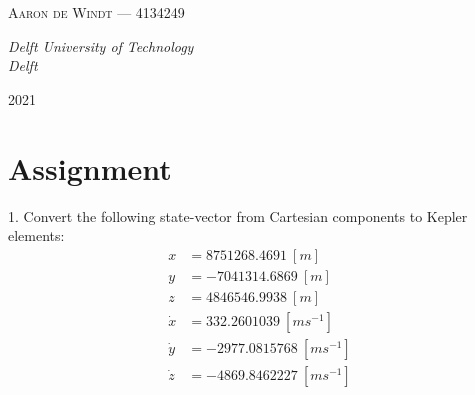 \begin{titlepage}
        
        \vspace{0.5\baselineskip} %
        
        {\scshape\Large Aaron de Windt --- 4134249} %
        
        \vspace{0.5\baselineskip} %
        
        \textit{Delft University of Technology \\ Delft} %
        
        \vfill %
        
        
        
        \vspace{0.3\baselineskip} %
        
        2021 %
        

    \end{titlepage}


    
    \newpage
    
    \section{Assignment}
    1. Convert the following state-vector from Cartesian components to Kepler elements:
    \begin{align*}
        x&=8751268.4691\ [m] \\
        y&=-7041314.6869\ [m] \\
        z&=4846546.9938\ [m] \\
        \dot{x}&=332.2601039\ [m s^{-1}] \\
        \dot{y}&=-2977.0815768\ [m s^{-1}] \\
        \dot{z}&=-4869.8462227\ [m s^{-1}] \\
    \end{align*}
    
